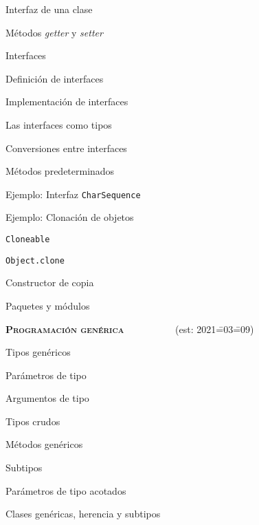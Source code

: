 \begin{longenum}
\begin{longenum}
\begin{longenum}
            \item Interfaz de una clase
            \item Métodos \textit{getter} y \textit{setter}
        \end{longenum}
        \item Interfaces
        \begin{longenum}
            \item Definición de interfaces
            \item Implementación de interfaces
            \item Las interfaces como tipos
            \item Conversiones entre interfaces
            \item Métodos predeterminados
            \item Ejemplo: Interfaz \texttt{CharSequence}
            \item Ejemplo: Clonación de objetos
            \begin{longenum}
                \item \texttt{Cloneable}
                \item \texttt{Object.clone}
                \item Constructor de copia
            \end{longenum}
        \end{longenum}
        \item Paquetes y módulos
    \end{longenum}
    \item \textbf{\textsc{Programación genérica}} \ \ \ \ \ \ \ \ \ \ (est: 2021\==03\==09)
    \begin{longenum}
        \item Tipos genéricos
        \begin{longenum}
            \item Parámetros de tipo
            \item Argumentos de tipo
            \item Tipos crudos
        \end{longenum}
        \item Métodos genéricos
        \item Subtipos
        \begin{longenum}
            \item Parámetros de tipo acotados
            \item Clases genéricas, herencia y subtipos

\end{longenum}
\end{longenum}
\end{longenum}
